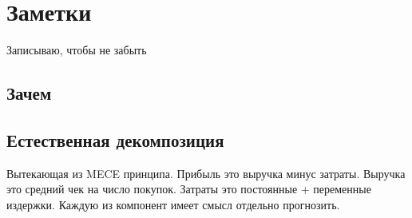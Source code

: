 \chapter{Заметки}
Записываю, чтобы не забыть

\section{Зачем}

\section{Естественная декомпозиция}

Вытекающая из MECE принципа. Прибыль это выручка минус затраты.
Выручка это средний чек на число покупок. Затраты это постоянные +
переменные издержки.
Каждую из компонент имеет смысл отдельно прогнозить.
